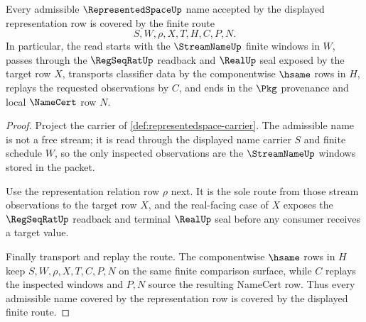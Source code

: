 \begin{theorem}
\label{thm:representedspace-admissible-name-coverage}
Every admissible $\RepresentedSpaceUp$ name accepted by the displayed representation row is covered by the finite route
$$
S,W,\rho,X,T,H,C,P,N.
$$
In particular, the read starts with the $\StreamNameUp$ finite windows in $W$, passes through the $\RegSeqRatUp$ readback and $\RealUp$ seal exposed by the target row $X$, transports classifier data by the componentwise $\hsame$ rows in $H$, replays the requested observations by $C$, and ends in the $\Pkg$ provenance and local $\NameCert$ row $N$.
\end{theorem}
\begin{proof}
Project the carrier of \autoref{def:representedspace-carrier}. The admissible name is not a free stream; it is read through the displayed name carrier $S$ and finite schedule $W$, so the only inspected observations are the $\StreamNameUp$ windows stored in the packet.

Use the representation relation row $\rho$ next. It is the sole route from those stream observations to the target row $X$, and the real-facing case of $X$ exposes the $\RegSeqRatUp$ readback and terminal $\RealUp$ seal before any consumer receives a target value.

Finally transport and replay the route. The componentwise $\hsame$ rows in $H$ keep $S,W,\rho,X,T,C,P,N$ on the same finite comparison surface, while $C$ replays the inspected windows and $P,N$ source the resulting NameCert row. Thus every admissible name covered by the representation row is covered by the displayed finite route.
\end{proof}

